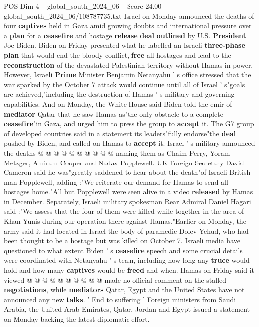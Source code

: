 \begin{textsample}{POS Dim 4 – global\_south\_2024\_06 – Score 24.00 – global\_south\_2024\_06/108787735.txt}  \label{ex:f4_pos_088}
Israel on Monday announced the deaths of four \textbf{captives} held in Gaza amid growing doubts and international pressure over a \textbf{plan} for a \textbf{ceasefire} and hostage \textbf{release} \textbf{deal} \textbf{outlined} by U.S. \textbf{President} Joe Biden.
Biden on Friday presented what he labelled an Israeli \textbf{three-phase} \textbf{plan} that would end the bloody conflict, \textbf{free} all hostages and lead to the \textbf{reconstruction} of the devastated Palestinian territory without Hamas in power.
However, Israeli \textbf{Prime} Minister Benjamin Netanyahu ' s office stressed that the war sparked by the October 7 attack would continue until all of Israel ' s"goals are achieved,"including the destruction of Hamas ' s military and governing capabilities.
And on Monday, the White House said Biden told the emir of \textbf{mediator} Qatar that he saw Hamas as"the only obstacle to a complete \textbf{ceasefire}"in Gaza, and urged him to press the group to \textbf{accept} it.
The G7 group of developed countries said in a statement its leaders"fully endorse"the \textbf{deal} pushed by Biden, and called on Hamas to \textbf{accept} it.
Israel ' s military announced the deaths @ @ @ @ @ @ @ @ @ @ naming them as Chaim Perry, Yoram Metzger, Amiram Cooper and Nadav Popplewell.
UK Foreign Secretary David Cameron said he was"greatly saddened to hear about the death"of Israeli-British man Popplewell, adding :"We reiterate our demand for Hamas to send all hostages home."All but Popplewell were seen alive in a video \textbf{released} by Hamas in December.
Separately, Israeli military spokesman Rear Admiral Daniel Hagari said :"We assess that the four of them were killed while together in the area of Khan Yunis during our operation there against Hamas."Earlier on Monday, the army said it had located in Israel the body of paramedic Dolev Yehud, who had been thought to be a hostage but was killed on October 7.
Israeli media have questioned to what extent Biden ' s \textbf{ceasefire} speech and some crucial details were coordinated with Netanyahu ' s team, including how long any \textbf{truce} would hold and how many \textbf{captives} would be \textbf{freed} and when.
Hamas on Friday said it viewed @ @ @ @ @ @ @ @ @ @ made no official comment on the stalled \textbf{negotiations}, while \textbf{mediators} Qatar, Egypt and the United States have not announced any new \textbf{talks}. ' End to suffering ' Foreign ministers from Saudi Arabia, the United Arab Emirates, Qatar, Jordan and Egypt issued a statement on Monday backing the latest diplomatic effort.

\end{textsample}

